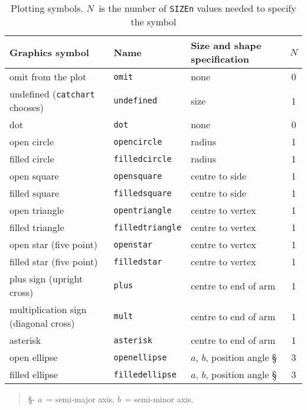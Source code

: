 \documentclass[twoside,11pt]{starlink}
\begin{document}
\begin{table}[htbp]

\begin{center}
\begin{tabular}{lllc}
Graphics symbol          & Name      & Size and shape specification & $N$ \\ \hline
omit from the plot       & \texttt{omit}           &  none             & 0 \\
undefined (\texttt{catchart} chooses)    & \texttt{undefined}    &  size  & 1 \\
dot                      & \texttt{dot}            &  none             & 0 \\
open circle              & \texttt{opencircle}     &  radius           & 1 \\
filled circle            & \texttt{filledcircle}   &  radius           & 1 \\
open square              & \texttt{opensquare}     &  centre to side   & 1 \\
filled square            & \texttt{filledsquare}   &  centre to side   & 1 \\
open triangle            & \texttt{opentriangle}   &  centre to vertex & 1 \\
filled triangle          & \texttt{filledtriangle} &  centre to vertex & 1 \\
open star (five point)   & \texttt{openstar}   &  centre to vertex     & 1 \\
filled star (five point) & \texttt{filledstar} &  centre to vertex     & 1 \\
plus sign (upright cross) & \texttt{plus}      &  centre to end of arm & 1 \\
multiplication sign (diagonal cross) & \texttt{mult} &  centre to end of arm & 1 \\
asterisk                 & \texttt{asterisk}   &  centre to end of arm & 1 \\
open ellipse             & \texttt{openellipse}   & $a$, $b$, position angle \S & 3 \\
filled ellipse           & \texttt{filledellipse} & $a$, $b$, position angle \S & 3 \\

\end{tabular}
\end{center}

\begin{quote}
\S - $a$\, = semi-major axis, $b$\, = semi-minor axis.
\end{quote}

\begin{quote}
\caption[Plotting symbols]{Plotting symbols.  $N$\, is the number of
\texttt{SIZEn} values needed to specify the symbol \label{GRT_SYMBOL} }
\end{quote}

\end{table}
\end{document}
